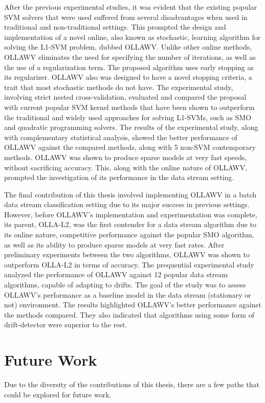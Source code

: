 \documentclass[reqno]{vcuthesis}
\numberwithin{equation}{chapter}
\begin{document}
After the previous experimental studies, it was evident that the existing popular SVM solvers that were used suffered from several disadvantages when used in traditional and non-traditional settings. This prompted the design and implementation of a novel online, also known as stochastic, learning algorithm for solving the L1-SVM problem, dubbed OLLAWV. Unlike other online methods, OLLAWV eliminates the need for specifying the number of iterations, as well as the use of a regularization term. The proposed algorithm uses early stopping as its regularizer. OLLAWV also was designed to have a novel stopping criteria, a trait that most stochastic methods do not have. The experimental study, involving strict nested cross-validation, evaluated and compared the proposal with current popular SVM kernel methods that have been shown to outperform the traditional and widely used approaches for solving L1-SVMs, such as SMO and quadratic programming solvers. The results of the experimental study, along with complementary statistical analysis, showed the better performance of OLLAWV against the compared methods, along with 5 non-SVM contemporary methods. OLLAWV was shown to produce sparse models at very fast speeds, without sacrificing accuracy. This, along with the online nature of OLLAWV, prompted the investigation of its performance in the data stream setting. 

The final contribution of this thesis involved implementing OLLAWV in a batch data stream classification setting due to its major success in previous settings. However, before OLLAWV's implementation and experimentation was complete, its parent, OLLA-L2, was the first contender for a data stream algorithm due to its online nature, competitive performance against the popular SMO algorithm, as well as its ability to produce sparse models at very fast rates. After preliminary experiments between the two algorithms, OLLAWV was shown to outperform OLLA-L2 in terms of accuracy. The prequential experimental study analyzed the performance of OLLAWV against 12 popular data stream algorithms, capable of adapting to drifts. The goal of the study was to assess OLLAWV's performance as a baseline model in the data stream (stationary or not) environment. The results highlighted OLLAWV's better performance against the methods compared. They also indicated that algorithms using some form of drift-detector were superior to the rest.

\chapter{Future Work}
Due to the diversity of the contributions of this thesis, there are a few paths that could be explored for future work. 
\end{document}
